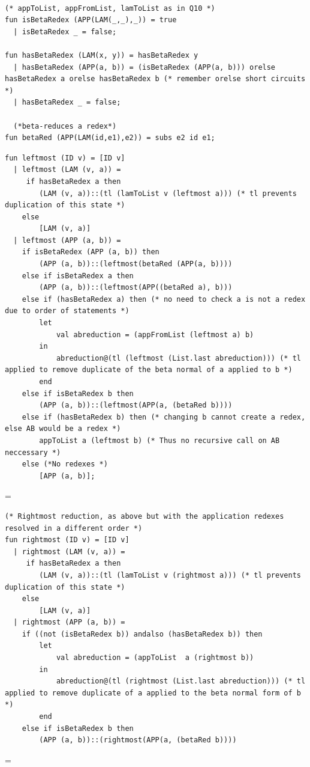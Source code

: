 \documentclass[11pt]{article}
\newenvironment{neverbreak} %
{\par\nobreak\vfil\penalty0\vfilneg
	\vtop\bgroup}
{\par\xdef\tpd{\the\prevdepth}\egroup
	\prevdepth=\tpd}
\begin{document}
\begin{enumerate}
\begin{verbatim}

(* appToList, appFromList, lamToList as in Q10 *)
fun isBetaRedex (APP(LAM(_,_),_)) = true
  | isBetaRedex _ = false;

fun hasBetaRedex (LAM(x, y)) = hasBetaRedex y
  | hasBetaRedex (APP(a, b)) = (isBetaRedex (APP(a, b))) orelse hasBetaRedex a orelse hasBetaRedex b (* remember orelse short circuits *)
  | hasBetaRedex _ = false;
  
  (*beta-reduces a redex*)
fun betaRed (APP(LAM(id,e1),e2)) = subs e2 id e1;
\end{verbatim}
\begin{neverbreak}
	\begin{verbatim}  
fun leftmost (ID v) = [ID v]
  | leftmost (LAM (v, a)) =
	 if hasBetaRedex a then
		(LAM (v, a))::(tl (lamToList v (leftmost a))) (* tl prevents duplication of this state *)
	else
		[LAM (v, a)]
  | leftmost (APP (a, b)) =
	if isBetaRedex (APP (a, b)) then
		(APP (a, b))::(leftmost(betaRed (APP(a, b))))
	else if isBetaRedex a then
		(APP (a, b))::(leftmost(APP((betaRed a), b)))
	else if (hasBetaRedex a) then (* no need to check a is not a redex due to order of statements *)
		let
			val abreduction = (appFromList (leftmost a) b)
		in
			abreduction@(tl (leftmost (List.last abreduction))) (* tl applied to remove duplicate of the beta normal of a applied to b *)
		end
	else if isBetaRedex b then
		(APP (a, b))::(leftmost(APP(a, (betaRed b))))
	else if (hasBetaRedex b) then (* changing b cannot create a redex, else AB would be a redex *)
		appToList a (leftmost b) (* Thus no recursive call on AB neccessary *)
	else (*No redexes *)
		[APP (a, b)];
	\end{verbatim}
\end{neverbreak}
\begin{neverbreak}
	\begin{verbatim}
(* Rightmost reduction, as above but with the application redexes resolved in a different order *)
fun rightmost (ID v) = [ID v]
  | rightmost (LAM (v, a)) =
	 if hasBetaRedex a then
		(LAM (v, a))::(tl (lamToList v (rightmost a))) (* tl prevents duplication of this state *)
	else
		[LAM (v, a)]
  | rightmost (APP (a, b)) =
  	if ((not (isBetaRedex b)) andalso (hasBetaRedex b)) then 
		let
			val abreduction = (appToList  a (rightmost b))
		in
			abreduction@(tl (rightmost (List.last abreduction))) (* tl applied to remove duplicate of a applied to the beta normal form of b *)
		end
	else if isBetaRedex b then
		(APP (a, b))::(rightmost(APP(a, (betaRed b))))

\end{verbatim}
\end{neverbreak}
\end{enumerate}
\end{document}
